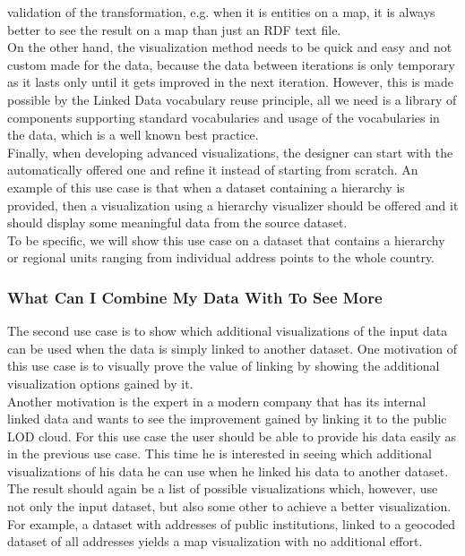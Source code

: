 \documentclass[a4paper,12pt,oneside]{report}
\begin{document}
{{{{validation of the transformation, e.g. when it is entities on a map, it is always better to see the result on a map than just an RDF text file.\\
On the other hand, the visualization method needs to be quick and easy and not custom made for the data, because the data between iterations is only temporary as it lasts only until it gets improved in the next iteration. However, this is made possible by the Linked Data vocabulary reuse principle, all we need is a library of components supporting standard vocabularies and usage of the vocabularies in the data, which is a well known best practice.\\
 Finally, when developing advanced visualizations, the designer can start with the automatically offered one and refine it instead of starting from scratch.
An example of this use case is that when a dataset containing a hierarchy is provided, then a visualization using a hierarchy visualizer should be offered and it should display some meaningful data from the source dataset.\\
 To be specific, we will show this use case on a dataset that contains a hierarchy or regional units ranging from individual address points to the whole country.
\subsubsection{What Can I Combine My Data With To See More}
{The second use case is to show which additional visualizations of the input data can be used when the data is simply linked to another dataset. One motivation of this use case is to visually prove the value of linking by showing the additional visualization options gained by it.\\ Another motivation is the expert in a modern company that has its internal linked data and wants to see the improvement gained by linking it to the public LOD cloud. For this use case the user should be able to provide his data easily as in the previous
use case. This time he is interested in seeing which additional visualizations of his data he can use when he linked his data to another dataset.\\ The result should again be a list of possible visualizations which, however, use not only the input
dataset, but also some other to achieve a better visualization. For example, a dataset with addresses of public institutions, linked to a geocoded dataset of all addresses yields a map visualization with no additional effort.}
}}}}
\end{document}
